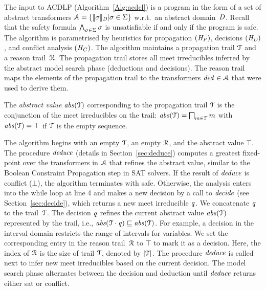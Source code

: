 The input to ACDLP (Algorithm~\ref{Alg:acdcl}) is a
program in the form of a set of abstract transformers
$\mathcal{A}=\{\llbracket \sigma \rrbracket_{\mathit{D}}|\sigma\in\Sigma\}$
w.r.t.\ an abstract domain~$\mathit{D}$.  Recall that the safety 
formula $\bigwedge_{\sigma\in\Sigma} \sigma$ 
is unsatisfiable if and only if the program is safe.  
The algorithm is parametrised by heuristics for propagation $(\mathit{H_P})$, 
decisions $(\mathit{H_D})$, and conflict analysis $(\mathit{H_C})$.
The algorithm maintains a propagation trail $\mathcal{T}$ and 
a reason trail~$\mathcal{R}$.
The propagation trail stores all meet irreducibles inferred by 
the abstract model search phase (deductions and decisions).  
The reason trail maps the elements of the propagation trail to the
transformers $\mathit{ded}^{}\in\mathcal{A}$ that were used to
derive them. 
%
\begin{definition} 
The \emph{abstract value} $\mathit{abs}(\mathcal{T})$ corresponding to 
the propagation trail $\mathcal{T}$ is the conjunction of the 
meet irreducibles on the trail:
$\mathit{abs}(\mathcal{T})=\bigsqcap_{m \in \mathcal{T}}m$ with
$\mathit{abs}(\mathcal{T})=\top$ if $\mathcal{T}$ is the empty sequence.
\end{definition}
%
The algorithm begins with an empty $\mathcal{T}$, an empty $\mathcal{R}$, and the
abstract value $\top$.  The procedure $\mathit{deduce}$ (details in
Section~\ref{sec:deduce}) computes a greatest fixed-point over the
transformers in $\mathcal{A}$ that refines the abstract value,
similar to the Boolean Constraint Propagation
step in SAT solvers.  If the result of $\mathit{deduce}$
is \textsf{conflict} ($\bot$), the algorithm terminates with
\textsf{safe}.  Otherwise, the analysis enters into the while loop at line 4
and makes a new decision by a call to $\mathit{decide}$ (see
Section~\ref{sec:decide}), which returns a new meet irreducible
$\mathit{q}$.
%
%
We concatenate $\mathit{q}$ to the trail~$\mathcal{T}$.  The decision
$\mathit{q}$ refines the current abstract value $\mathit{abs}(\mathcal{T})$ represented
by the trail, i.e., $\mathit{abs}(\mathcal{T}\cdot\mathit{q})\sqsubseteq \mathit{abs}(\mathcal{T})$.
%
%
For example, a decision in the interval domain restricts the range of 
intervals for variables.
%
We set the corresponding entry in the reason trail~$\mathcal{R}$ to $\top$
to mark it as a decision.  Here, the index of $\mathcal{R}$ is the size 
of trail $\mathcal{T}$, denoted by $|\mathcal{T}|$.
%
The procedure $\mathit{deduce}$ is called next to infer new meet irreducibles
based on the current decision.  The model search phase
alternates between the decision and deduction until $\mathit{deduce}$ returns
either \textsf{sat} or \textsf{conflict}.  

